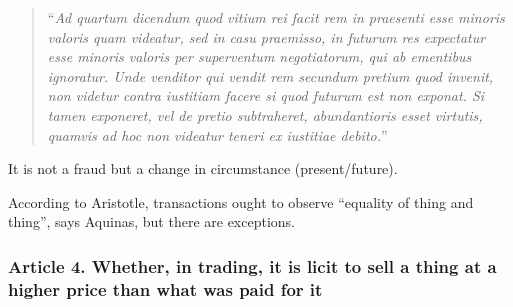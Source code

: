                     \begin{quote}
                        ``\textit{Ad quartum dicendum quod vitium rei facit rem in praesenti esse minoris valoris quam videatur, sed in casu praemisso, in futurum res expectatur esse minoris valoris per superventum negotiatorum, qui ab ementibus ignoratur. Unde venditor qui vendit rem secundum pretium quod invenit, non videtur contra iustitiam facere si quod futurum est non exponat. Si tamen exponeret, vel de pretio subtraheret, abundantioris esset virtutis, quamvis ad hoc non videatur teneri ex iustitiae debito.}''
                    \end{quote}

                \begin{remark}
                    It is not a fraud but a change in circumstance (present/future).
                \end{remark}

                According to Aristotle, transactions ought to observe “equality of thing and thing”, says Aquinas, but there are exceptions.

            \subsubsection{Article 4. Whether, in trading, it is licit to sell a thing at a higher price than what was paid for it}

